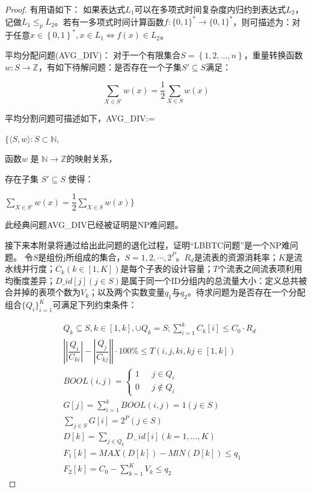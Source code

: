 \begin{proof}
		
	有用语如下：
	如果表达式$L_1$可以在多项式时间复杂度内归约到表达式$L_2$，记做$L_1 \leq_p L_2$。若有一多项式时间计算函数$f:\{0,1\}^{\ast}\rightarrow\{0,1\}^{\ast}$，则可描述为：对于任意$x\in \left\{ 0,1\right\} ^{\ast },x\in L_{1}\Leftrightarrow f\left( x\right) \in L_{2}$。
	
	
	
	
	平均分配问题(AVG\_DIV)：
	对于一个有限集合$S=\left\{ 1,2,\ldots ,n\right\}$，重量转换函数 $w:S\rightarrow \mathbb{Z} $，有如下待解问题：是否存在一个子集$S'\subseteq S$满足：
	
	\begin{equation}
	\sum_{X\in S'}w\left( x\right) =\dfrac {1}{2}\sum _{X\in S}w\left( x\right) 
	\end{equation}
	
	平均分割问题可描述如下，AVG\_DIV:=
	
	\noindent $\{ \langle  S, w\rangle  :S\subset \mathbb{N} $,
	
	\quad 函数$w$ 是 $\mathbb{N} \rightarrow \mathbb{Z} $的映射关系，
	
	\quad 存在子集 $S'\subseteq S$ 使得： 
	
	\quad $\sum_{X\in S'}w\left( x\right) =\dfrac {1}{2}\sum _{X\in S}w\left( x\right) \}$ 
	
	此经典问题AVG\_DIV已经被证明是NP难问题。
	
	接下来本附录将通过给出此问题的退化过程，证明“LBBTC问题”是一个NP难问题。
	令$S$是组份j所组成的集合，$S={1,2,\cdots,2^P}$。$R_d$是流表的资源消耗率；$K$是流水线并行度；$C_k(k\in [1,K])$是每个子表的设计容量；$T$个流表之间流表项利用均衡度差异；$D\_id[j](j\in S)$是属于同一个ID分组内的总流量大小：定义总共被合并掉的表项个数为$V_k$；以及两个实数变量$q_1$与$q_2$。待求问题为是否存在一个分配组合$\{Q_i\}^{K}_{i=1}$可满足下列约束条件：
	
	\begin{align}\label{a2}
	&Q_{k}\subseteq S, k\in \left[ 1,k\right],\cup Q_{k}=S;\sum ^{k}_{i=1}C_{k}\left[ i\right] \leq C_{0}\cdot R_{d}  \\
	&\left| \left| \dfrac {Q_{i}}{C_{ki}}\right| -\left| \dfrac {Q_{j}}{C_{kj}}\right| \right|\cdot 100\%\leq T\left( i, j, ki, kj\in \left[ 1,k\right] \right)  \\
	&BOOL\left(i,j\right)=
	\begin{cases}
	1& \text{ $j \in Q_i$ }\\
	0& \text{ $j \notin Q_i$}
	\end{cases}\\
	&G\left[ j\right] =\sum ^{k}_{i=1}BOOL\left( i,j\right) =1\left( j\in S\right) \\
	&\sum _{j\in S}G\left[ i\right] =2^{P}\left( j\in S\right) \\
	&D\left[ k\right] =\sum _{j\in Q_{k}}D_{-}id\left[ i\right] \left( k=1,\ldots ,K\right)\\
	&F_{1}\left[ k\right] =MAX\left( D\left[ k\right] \right) -MlN\left( D\left[ k\right] \right) \leq q_1 \\
	&F_{2}\left[ k\right] =C_{0}-\sum ^{K}_{k=1}V_{k}\leq q_{2} 
	\end{align}
	

\end{proof}
